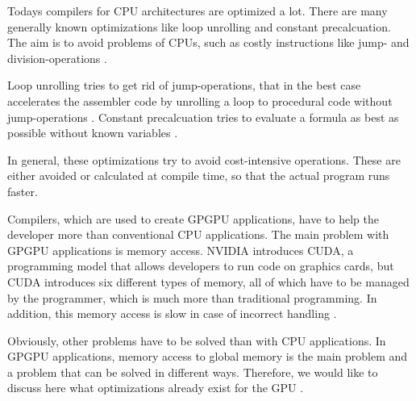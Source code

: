 \documentclass[conference]{IEEEtran}
\begin{document}
	Todays compilers for CPU architectures are optimized a lot. There are many generally known optimizations like loop unrolling and constant precalcuation. The aim is to avoid problems of CPUs, such as costly instructions like jump- and division-operations \cite{gccoptimizations}.
	
	Loop unrolling tries to get rid of jump-operations, that in the best case accelerates the assembler code by unrolling a loop to procedural code without jump-operations \cite{gccoptimizations}. Constant precalcuation tries to evaluate a formula as best as possible without known variables \cite{gccoptimizations}.
	
	In general, these optimizations try to avoid cost-intensive operations. These are either avoided or calculated at compile time, so that the actual program runs faster. 
	
	Compilers, which are used to create GPGPU applications, have to help the developer more than conventional CPU applications. The main problem with GPGPU applications is memory access. NVIDIA introduces CUDA, a programming model that allows developers to run code on graphics cards, but CUDA introduces six different types of memory, all of which have to be managed by the programmer, which is much more than traditional programming. In addition, this memory access is slow in case of incorrect handling \cite{nvc} \cite{cudap}.
	
	Obviously, other problems have to be solved than with CPU applications. In GPGPU applications, memory access to global memory is the main problem and a problem that can be solved in different ways.
	Therefore, we would like to discuss here what optimizations already exist for the GPU \cite{nvc} \cite{cudap}.
	
		
	
			

	
\end{document}

